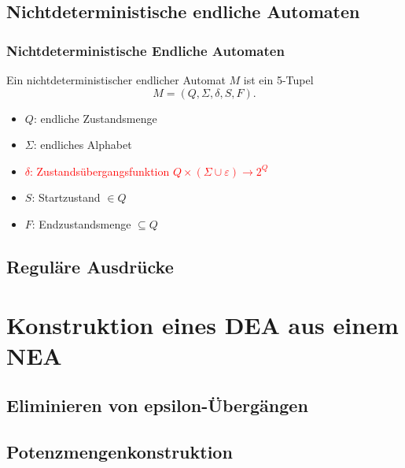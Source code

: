 \documentclass{beamer}
\begin{document}
\subsection{Nichtdeterministische endliche Automaten}
\begin{frame}
\frametitle{Nichtdeterministische Endliche Automaten}
        Ein nichtdeterministischer endlicher Automat $M$ ist ein 5-Tupel
        \[
        M= (Q,\Sigma,\delta,S,F).
        \]
        \begin{itemize}
        \item $Q$:  endliche Zustandsmenge
        \item $\Sigma$:    endliches Alphabet
        \item \textcolor{red}{$\delta$:   Zustandsübergangsfunktion $Q\times (\Sigma \cup \varepsilon) \rightarrow 2^Q$}
        \item $S$:   Startzustand $\in Q$
        \item $F$:   Endzustandsmenge $\subseteq Q$
        \end{itemize}
\end{frame}
\subsection{Reguläre Ausdrücke}
\section{Konstruktion eines DEA aus einem NEA}
\subsection{Eliminieren von epsilon-Übergängen}
\subsection{Potenzmengenkonstruktion}
\end{document}
